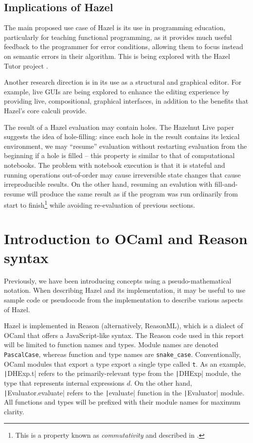 \subsection{Implications of Hazel}
\label{sec:hazel-implications}

The main proposed use case of Hazel is its use in programming education, particularly for teaching functional programming, as it provides much useful feedback to the programmer for error conditions, allowing them to focus instead on semantic errors in their algorithm. This is being explored with the Hazel Tutor project \cite{potter2020hazel}.

Another research direction is in its use as a structural and graphical editor. For example, live GUIs \cite{omar2021filling} are being explored to enhance the editing experience by providing live, compositional, graphical interfaces, in addition to the benefits that Hazel's core calculi provide.

The result of a Hazel evaluation may contain holes. The Hazelnut Live paper \cite{conf/popl/HazelnutLive19} suggests the idea of hole-filling: since each hole in the result contains its lexical environment, we may ``resume'' evaluation without restarting evaluation from the beginning if a hole is filled -- this property is similar to that of computational notebooks. The problem with notebook execution is that it is stateful and running operations out-of-order may cause irreversible state changes that cause irreproducible results. On the other hand, resuming an evalution with fill-and-resume will produce the same result as if the program was run ordinarily from start to finish\footnote{This is a property known as \textit{commutativity} and described in \cite{conf/popl/HazelnutLive19}.} while avoiding re-evaluation of previous sections.

\section{Introduction to OCaml and Reason syntax}
\label{sec:ocaml-intro}

Previously, we have been introducing concepts using a pseudo-mathematical notation. When describing Hazel and its implementation, it may be useful to use sample code or pseudocode from the implementation to describe various aspects of Hazel.

Hazel is implemented in Reason (alternatively, ReasonML), which is a dialect of OCaml that offers a JavaScript-like syntax. The Reason code used in this report will be limited to function names and types. Module names are denoted \texttt{PascalCase}, whereas function and type names are \texttt{snake\_case}. Conventionally, OCaml modules that export a type export a single type called \texttt{t}. As an example, \texttt|DHExp.t| refers to the primarily-relevant type from the \texttt|DHExp| module, the type that represents internal expressions $d$. On the other hand, \texttt|Evaluator.evaluate| refers to the \texttt|evaluate| function in the \texttt|Evaluator| module. All functions and types will be prefixed with their module names for maximum clarity.

